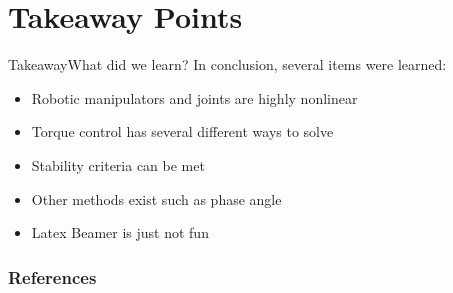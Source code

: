 \documentclass{beamer}
\begin{document}
\section[Conclusion]{Takeaway Points}

\begin{frame}{Takeaway}{What did we learn?}
In conclusion, several items were learned:
\begin{itemize}
	\item Robotic manipulators and joints are highly nonlinear
	\item Torque control has several different ways to solve
	\item Stability criteria can be met
	\item Other methods exist such as phase angle \cite{7525846}
	\item Latex Beamer is just not fun
\end{itemize}
\end{frame}

\begin{frame}[allowframebreaks]
        \frametitle{References}
        
        
\end{frame}
\end{document}
